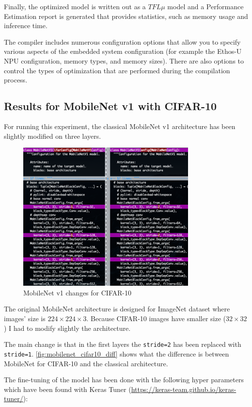 Finally, the optimized model is written out as a $TFL\mu$ model and a
Performance Estimation report is generated that provides statistics, such as
memory usage and inference time.

The compiler includes numerous configuration options that allow you to specify
various aspects of the embedded system configuration (for example the Ethos-U
NPU configuration, memory types, and memory sizes). There are also options to
control the types of optimization that are performed during the compilation
process.\cite{vela_compiler}

\subsection{Results for MobileNet v1 with CIFAR-10}
For running this experiment, the classical MobileNet v1 architecture has been
slightly modified on three layers.

\begin{figure}[ht]
    \includegraphics[width=9cm]{images/experiments/mobilenet_cifar10_diff.png}
    \centering
    \caption{MobileNet v1 changes for CIFAR-10}\label{fig:mobilenet_cifar10_diff}
\end{figure}

The original MobileNet architecture is designed for ImageNet dataset where
images' size is $224\times224\times3$. Because CIFAR-10 images have smaller
size ($32\times32$) I had to modify slightly the architecture.

The main change is that in the first layers the \texttt{stride=2} has been
replaced with \texttt{stride=1}.
\autoref{fig:mobilenet_cifar10_diff} shows what the difference is between
MobileNet for CIFAR-10 and the classical architecture.

The fine-tuning of the model has been done with the following hyper parameters
which have been found with Keras Tuner
(\url{https://keras-team.github.io/keras-tuner/}):

